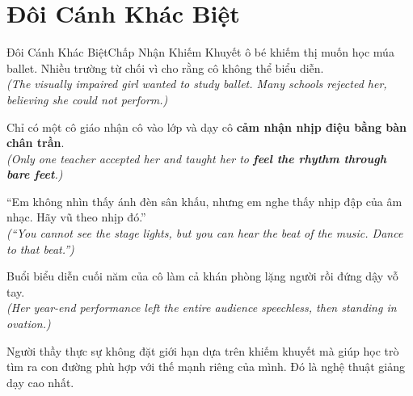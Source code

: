 \section{Đôi Cánh Khác Biệt}
\begin{truyen}{Đôi Cánh Khác Biệt}{Chấp Nhận Khiếm Khuyết}
ô bé khiếm thị muốn học múa ballet. Nhiều trường từ chối vì cho rằng cô không thể biểu diễn.\\
\textit{(The visually impaired girl wanted to study ballet. Many schools rejected her, believing she could not perform.)}

Chỉ có một cô giáo nhận cô vào lớp và dạy cô \textbf{cảm nhận nhịp điệu bằng bàn chân trần}.\\
\textit{(Only one teacher accepted her and taught her to \textbf{feel the rhythm through bare feet}.)}

``Em không nhìn thấy ánh đèn sân khấu, nhưng em nghe thấy nhịp đập của âm nhạc. Hãy vũ theo nhịp đó.''\\
\textit{(``You cannot see the stage lights, but you can hear the beat of the music. Dance to that beat.'')}

Buổi biểu diễn cuối năm của cô làm cả khán phòng lặng người rồi đứng dậy vỗ tay.\\
\textit{(Her year-end performance left the entire audience speechless, then standing in ovation.)}
\end{truyen}
\begin{baihoc}
  Người thầy thực sự không đặt giới hạn dựa trên khiếm khuyết mà giúp học trò tìm ra con đường phù hợp với thế mạnh riêng của mình. Đó là nghệ thuật giảng dạy cao nhất.
\end{baihoc}

